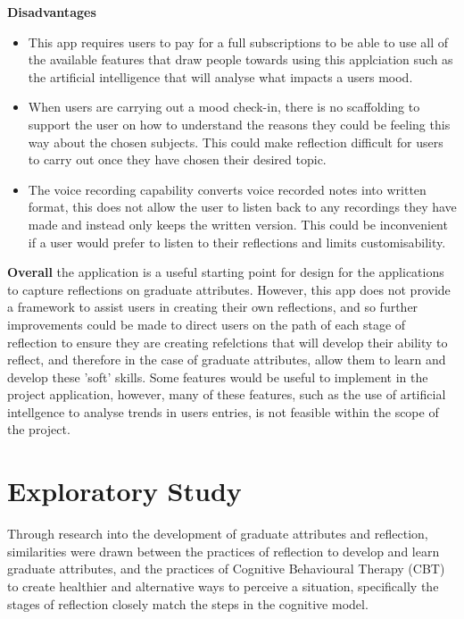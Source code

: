 \documentclass{l4proj}
\begin{document}
\textbf{Disadvantages}
\begin{itemize}
    \item This app requires users to pay for a full subscriptions to be able to use all of the available features that draw people towards using this applciation
    such as the artificial intelligence that will analyse what impacts a users mood. 
    \item When users are carrying out a mood check-in, there is no scaffolding to support the user on how to understand the reasons they could be feeling 
    this way about the chosen subjects. This could make reflection difficult for users to carry out once they have chosen their desired topic.
    \item The voice recording capability converts voice recorded notes into written format, this does not allow the user to listen back to any recordings they 
    have made and instead only keeps the written version. This could be inconvenient if a user would prefer to listen to their reflections and limits customisability.
\end{itemize}

\textbf{Overall} the application is a useful starting point for design for the applications to capture reflections on graduate attributes. However, this app
does not provide a framework to assist users in creating their own reflections, and so further improvements could be made to direct users on the path
of each stage of reflection to ensure they are creating refelctions that will develop their ability to reflect, and therefore in the case of graduate attributes,
allow them to learn and develop these 'soft' skills. Some features would
be useful to implement in the project application, however, many of these features, such as the use of artificial intellgence to analyse trends in users
entries, is not feasible within the scope of the project.



\chapter{Exploratory Study} \label{ExploratoryStudy}

Through research into the development of graduate attributes and reflection, similarities were drawn between the practices of reflection to develop and 
learn graduate attributes, and the practices of Cognitive Behavioural Therapy (CBT) to create healthier and alternative ways to perceive a situation, 
specifically the stages of reflection closely match the steps in the cognitive model. 
\end{document}
